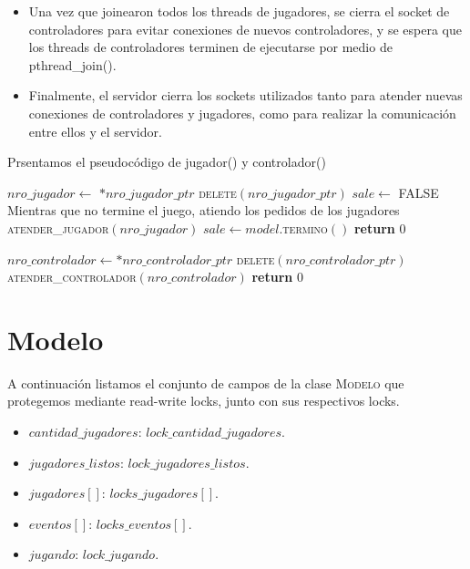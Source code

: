\documentclass[a4paper,10pt,twoside]{article}
\newenvironment{pseudo}[1][]{%
    \vspace{0.5em}%
    \begin{algorithmic}%
}
{%
    \end{algorithmic}%
    \vspace{0.5em}%
}
\newcommand{\Fn}[2]{\textsc{#1}$(#2)$}
\newcommand{\PReturn}[1]{\textbf{return} $#1$}
\newcommand{\PNot}{\textbf{not} }
\newcommand{\PTrue}{\textnormal{TRUE} }
\newcommand{\PFalse}{\textnormal{FALSE} }
\begin{document}
\begin{itemize}
    \item Una vez que joinearon todos los threads de jugadores, se cierra el socket de controladores para evitar conexiones de nuevos controladores, y se espera que los threads de controladores terminen de ejecutarse por medio de pthread\_join().

    \item Finalmente, el servidor cierra los sockets utilizados tanto para atender nuevas conexiones de controladores y jugadores, como para realizar la comunicación entre ellos y el servidor.
\end{itemize}

Prsentamos el pseudocódigo de jugador() y controlador()

\begin{pseudo}
        \State $nro\_jugador \leftarrow$ $*nro\_jugador\_ptr$
        \State \Fn{delete}{nro\_jugador\_ptr}
        \State $sale \leftarrow$ \PFalse
        \State
        \State Mientras que no termine el juego, atiendo los pedidos de los jugadores
        \State
        \While{\PNot $sale$}
            \State \Fn{atender\_jugador}{nro\_jugador}
            \State $sale \leftarrow model.$\Fn{termino}{}
        \EndWhile
        \State \PReturn{0}
    \EndProcedure
\end{pseudo}

\begin{pseudo}
        \State $nro\_controlador \leftarrow *nro\_controlador\_ptr$
        \State \Fn{delete}{nro\_controlador\_ptr}
        \While{\PTrue}
            \State \Fn{atender\_controlador}{nro\_controlador}
        \EndWhile
        \State \PReturn{0}
    \EndProcedure
\end{pseudo}




\section{Modelo}

A continuación listamos el conjunto de campos de la clase \textsc{Modelo} que protegemos mediante read-write locks, junto con sus respectivos locks.

\begin{itemize}
    \item{$cantidad\_jugadores$: $lock\_cantidad\_jugadores$.}
    \item{$jugadores\_listos$: $lock\_jugadores\_listos$.}
    \item{$jugadores[]$: $locks\_jugadores[]$.}
    \item{$eventos[]$: $locks\_eventos[]$.}
    \item{$jugando$: $lock\_jugando$.}    
\end{itemize}
\end{document}
